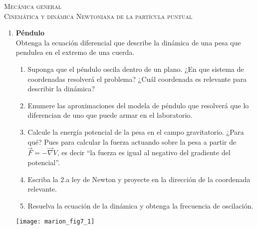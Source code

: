 \documentclass[11pt,spanish,a4paper]{article}
\begin{document}
\begin{center}
  \textsc{\large Mecánica general}\\
  \textsc{\large Cinemática y dinámica Newtoniana de la partícula puntual}
\end{center}

\begin{enumerate}


\subsection*{Ecuaciones de la dinámica - 2"a ley de Netwon}


\item
\begin{minipage}[t][10cm]{0.8\textwidth}
\textbf{Péndulo}\\
Obtenga la ecuación diferencial que describe la dinámica de una pesa que pendulea en el extremo de una cuerda.
\begin{enumerate}
	\item Suponga que el péndulo oscila dentro de un plano.
		¿En que sistema de coordenadas resolverá el problema? 
		¿Cuál coordenada es relevante para describir la dinámica? 
	\item Enumere las aproximaciones del modela de péndulo que resolverá que lo diferencian de uno que puede armar en el laboratorio.
	\item Calcule la energía potencial de la pesa en el campo gravitatorio. ¿Para qué? Pues para calcular la fuerza actuando sobre la pesa a partir de \(\vec{F} = - \vec{\nabla} V\), es decir ``la fuerza es igual al negativo del gradiente del potencial''.
	\item Escriba la 2.a ley de Newton y proyecte en la dirección de la coordenada relevante.
	\item Resuelva la ecuación de la dinámica y obtenga la frecuencia de oscilación.
\end{enumerate}
\end{minipage}
\begin{minipage}[c][0cm][t]{0.15\textwidth}
	\texttt{[image: marion\_fig7\_1]}
\end{minipage}


\end{enumerate}
\end{document}
